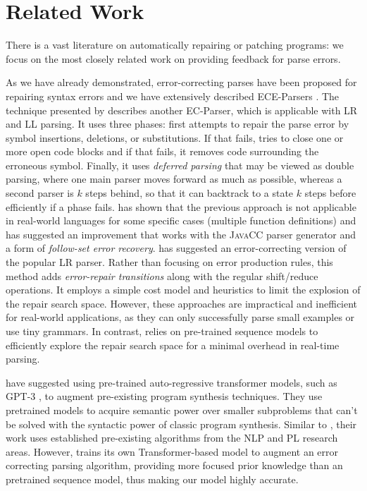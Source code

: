 \section{Related Work}
\label{sec:related-work}

There is a vast literature on automatically repairing or patching programs:
we focus on the most closely related work on providing feedback for parse
errors.

%
As we have already demonstrated, error-correcting parses have been proposed for
repairing syntax errors and we have extensively described ECE-Parsers
\citep{Aho_1972}. The technique presented by \citep{Burke1987} describes another
EC-Parser, which is applicable with LR and LL parsing. It uses three phases:
first attempts to repair the parse error by symbol insertions, deletions, or
substitutions. If that fails, tries to close one or more open code blocks and if
that fails, it removes code surrounding the erroneous symbol. Finally, it uses
\emph{deferred parsing} that may be viewed as double parsing, where one main
parser moves forward as much as possible, whereas a second parser is $k$ steps
behind, so that it can backtrack to a state $k$ steps before efficiently if a
phase fails. \citep{VanDerSpek_2005} has shown that the previous approach is not
applicable in real-world languages for some specific cases (\eg multiple
function definitions) and has suggested an improvement that works with the
\textsc{JavaCC} parser generator and a form of \emph{follow-set error recovery}.
\citep{Corchuelo2002} has suggested an error-correcting version of the popular
LR parser. Rather than focusing on error production rules, this method adds
\emph{error-repair transitions} along with the regular shift/reduce operations.
It employs a simple cost model and heuristics to limit the explosion of the
repair search space. However, these approaches are impractical and inefficient
for real-world applications, as they can only successfully parse small examples
or use tiny grammars. In contrast, \toolname relies on pre-trained sequence
models to efficiently explore the repair search space for a minimal overhead in
real-time parsing.

%
\citep{Rahmani2021, Verbruggen2021} have suggested using pre-trained
auto-regressive transformer models, such as \textsc{GPT-3} \citep{GPT2020}, to
augment pre-existing program synthesis techniques. They use pretrained models to
acquire semantic power over smaller subproblems that can't be solved with the
syntactic power of classic program synthesis. Similar to \toolname, their work
uses established pre-existing algorithms from the NLP and PL research areas.
However, \toolname trains its own Transformer-based model to augment an error
correcting parsing algorithm, providing more focused prior knowledge than an
pretrained sequence model, thus making our model highly accurate.

